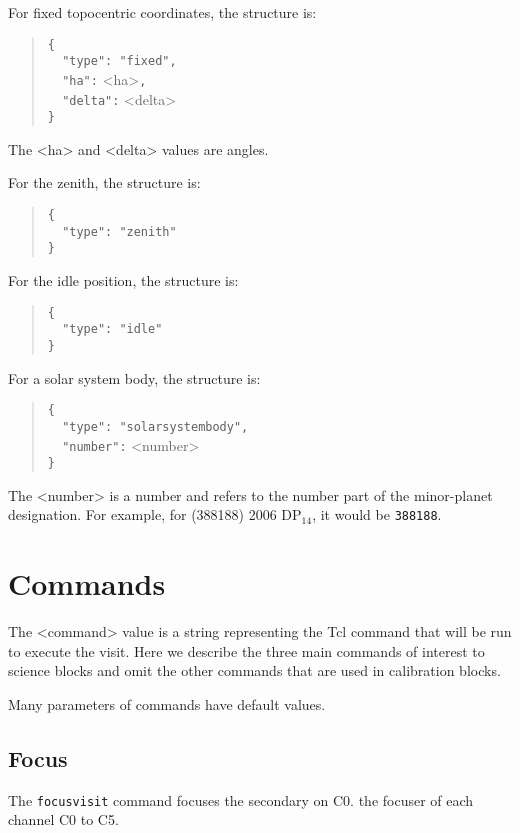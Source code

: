 For fixed topocentric coordinates, the structure is:
\begin{quote}
\verb|{|\\
\verb|  "type": "fixed",|\\
\verb|  "ha":| <ha>\verb|,|\\
\verb|  "delta":| <delta>\\
\verb|}|
\end{quote}

The <ha> and <delta> values are angles.

For the zenith, the structure is:
\begin{quote}
\verb|{|\\
\verb|  "type": "zenith"|\\
\verb|}|
\end{quote}

For the idle position, the structure is:
\begin{quote}
\verb|{|\\
\verb|  "type": "idle"|\\
\verb|}|
\end{quote}

For a solar system body, the structure is:
\begin{quote}
\verb|{|\\
\verb|  "type": "solarsystembody",|\\
\verb|  "number":| <number>\\
\verb|}|
\end{quote}

The <number> is a number and refers to the number part of the minor-planet designation. For example, for  (388188) 2006 DP$_{14}$, it would be \verb|388188|.

\section{Commands}

The <command> value is a string representing the Tcl command that will be run to execute the visit. Here we describe the three main commands of interest to science blocks and omit the other commands that are used in calibration blocks.

Many parameters of commands have default values.

\subsection{Focus}

The \verb|focusvisit| command focuses 
\ifcoatlioan
the secondary on C0.
\fi
\ifddotioan
the focuser of each channel C0 to C5.
\fi

